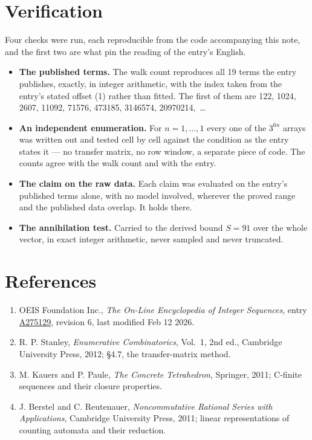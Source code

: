 \documentclass[11pt]{article}
\theoremstyle{definition}
\begin{document}
\section{Verification}

Four checks were run, each reproducible from the code accompanying this note, and the first two are what pin the reading of the entry's English.

\begin{itemize}

\item {\bfseries The published terms.} The walk count reproduces all 19 terms the entry publishes, exactly, in integer arithmetic, with the index taken from the entry's stated offset (1) rather than fitted. The first of them are 122, 1024, 2607, 11092, 71576, 473185, 3146574, 20970214,~\dots

\item {\bfseries An independent enumeration.} For $n = 1,\dots,1$ every one of the $3^{6n}$ arrays was written out and tested cell by cell against the condition as the entry states it --- no transfer matrix, no row window, a separate piece of code. The counts agree with the walk count and with the entry.

\item {\bfseries The claim on the raw data.} Each claim was evaluated on the entry's published terms alone, with no model involved, wherever the proved range and the published data overlap. It holds there.

\item {\bfseries The annihilation test.} Carried to the derived bound $S = 91$ over the whole vector, in exact integer arithmetic, never sampled and never truncated.

\end{itemize}

\section{References}

\begin{enumerate}

\item OEIS Foundation Inc., \emph{The On-Line Encyclopedia of Integer Sequences}, entry \href{https://oeis.org/A275129}{A275129}, revision 6, last modified Feb 12 2026.

\item R. P. Stanley, \emph{Enumerative Combinatorics}, Vol.~1, 2nd ed., Cambridge University Press, 2012; \S4.7, the transfer-matrix method.

\item M. Kauers and P. Paule, \emph{The Concrete Tetrahedron}, Springer, 2011; C-finite sequences and their closure properties.

\item J. Berstel and C. Reutenauer, \emph{Noncommutative Rational Series with Applications}, Cambridge University Press, 2011; linear representations of counting automata and their reduction.

\end{enumerate}
\end{document}
